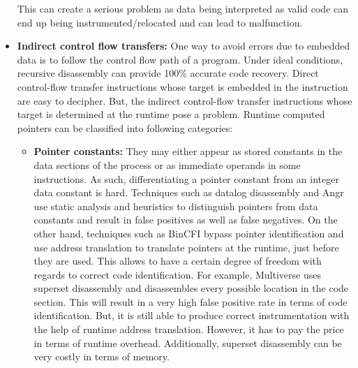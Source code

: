\begin{itemize}
    This can create a serious problem as data being interpreted as valid code can
    end up being instrumented/relocated and can lead to malfunction.

  \item \textbf{Indirect control flow transfers:} One way to avoid errors due to
    embedded data is to follow the control flow path of a program. Under ideal
    conditions, recursive disassembly can provide 100\% accurate code recovery.
    Direct control-flow transfer instructions whose target is embedded in the
    instruction are easy to decipher. But, the indirect control-flow transfer
    instructions whose target is determined at the runtime pose a problem.
    Runtime computed pointers can be classified into following categories:

    \begin{itemize}
      \item \textbf{Pointer constants:} They may either appear as stored
        constants in the data sections of the process or as immediate operands
        in some instructions. As such, differentiating a pointer constant from
        an integer data constant is hard. Techniques such as datalog disassembly
        \cite{} and Angr \cite{} use static analysis and heuristics to
        distinguish pointers from data constants and result in false positives
        as well as false negatives. On the other hand, techniques such as BinCFI
        \cite{} bypass pointer identification and use address translation to
        translate pointers at the runtime, just before they are used. This
        allows to have a certain degree of freedom with regards to correct code
        identification. For example, Multiverse \cite{} uses superset
        disassembly and disassembles every possible location in the code
        section. This will result in a very high false positive rate in terms of
        code identification. But, it is still able to produce correct
        instrumentation with the help of runtime address translation. However,
        it has to pay the price in terms of runtime overhead. Additionally,
        superset disassembly can be very costly in terms of memory.


\end{itemize}
\end{itemize}
